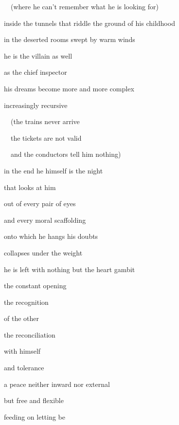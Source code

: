 \documentclass[a4paper]{article}
\begin{document}
\ \  (where he can’t remember what he is looking for)


\bigskip

inside the tunnels that riddle the ground of his childhood 


\bigskip

in the deserted rooms swept by warm winds


\bigskip

he is the villain as well

as the chief inspector


\bigskip

his dreams become more and more complex

increasingly recursive


\bigskip

\ \ (the trains never arrive

\ \ the tickets are not valid

\ \  and the conductors tell him nothing)


\bigskip


\bigskip


\bigskip

in the end he himself is the night

that looks at him

out of every pair of eyes


\bigskip

and every moral scaffolding

onto which he hangs his doubts

collapses under the weight


\bigskip


\bigskip

he is left with nothing but the heart gambit


\bigskip

the constant opening

the recognition

of the other

the reconciliation

with himself

and tolerance


\bigskip

a peace neither inward nor external

but free and flexible

feeding on letting be


\bigskip


\bigskip


\bigskip
\end{document}
